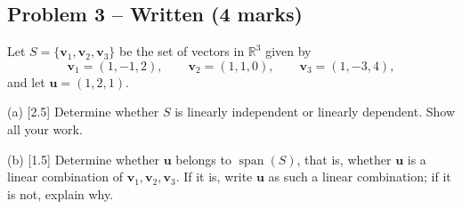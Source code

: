 \documentclass[11pt,a4paper]{article}
\begin{document}
\subsection*{Problem 3 -- Written (4 marks)}
Let $S=\{\mathbf{v}_1,\mathbf{v}_2,\mathbf{v}_3\}$ be the set of vectors in $\mathbb{R}^3$ given by\[\mathbf{v}_1=(1,-1,2),\qquad \mathbf{v}_2=(1,1,0),\qquad \mathbf{v}_3=(1,-3,4),\]and let $\mathbf{u}=(1,2,1)$.\par (a) [2.5] Determine whether $S$ is linearly independent or linearly dependent. Show all your work.\par (b) [1.5] Determine whether $\mathbf{u}$ belongs to $\operatorname{span}(S)$, that is, whether $\mathbf{u}$ is a linear combination of $\mathbf{v}_1,\mathbf{v}_2,\mathbf{v}_3$. If it is, write $\mathbf{u}$ as such a linear combination; if it is not, explain why.\par
\end{document}
